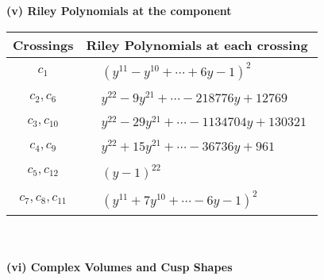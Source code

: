 \documentclass[1p]{elsarticle_modified}
\theoremstyle{definition}
\begin{document}
\newpage\renewcommand{\arraystretch}{1}
\flushleft \textbf{(v) Riley Polynomials at the component}\newline \\
\begin{tabular}{m{50pt}|m{274pt}}
Crossings & \hspace{64pt}Riley Polynomials at each crossing \\
\hline $$\begin{aligned}c_{1}\end{aligned}$$&$\begin{aligned}
&(y^{11}- y^{10}+\cdots+6 y-1)^{2}
\end{aligned}$\\
\hline $$\begin{aligned}c_{2},c_{6}\end{aligned}$$&$\begin{aligned}
&y^{22}-9 y^{21}+\cdots-218776 y+12769
\end{aligned}$\\
\hline $$\begin{aligned}c_{3},c_{10}\end{aligned}$$&$\begin{aligned}
&y^{22}-29 y^{21}+\cdots-1134704 y+130321
\end{aligned}$\\
\hline $$\begin{aligned}c_{4},c_{9}\end{aligned}$$&$\begin{aligned}
&y^{22}+15 y^{21}+\cdots-36736 y+961
\end{aligned}$\\
\hline $$\begin{aligned}c_{5},c_{12}\end{aligned}$$&$\begin{aligned}
&(y-1)^{22}
\end{aligned}$\\
\hline $$\begin{aligned}c_{7},c_{8},c_{11}\end{aligned}$$&$\begin{aligned}
&(y^{11}+7 y^{10}+\cdots-6 y-1)^{2}
\end{aligned}$\\
\hline
\end{tabular}\\~\\
\newpage\flushleft \textbf{(vi) Complex Volumes and Cusp Shapes}
\end{document}
